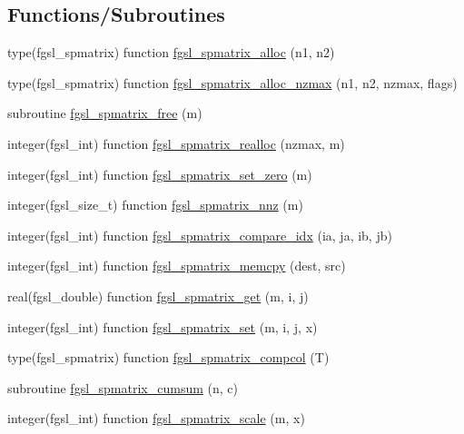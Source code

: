 \subsection*{Functions/\+Subroutines}
\begin{DoxyCompactItemize}
\item 
type(fgsl\+\_\+spmatrix) function \hyperlink{spmatrix_8finc_a55420bf9189f388cdc2fbf2eb3c516d9}{fgsl\+\_\+spmatrix\+\_\+alloc} (n1, n2)
\item 
type(fgsl\+\_\+spmatrix) function \hyperlink{spmatrix_8finc_ab79d40aba35d16643dc6bfd7534a8887}{fgsl\+\_\+spmatrix\+\_\+alloc\+\_\+nzmax} (n1, n2, nzmax, flags)
\item 
subroutine \hyperlink{spmatrix_8finc_ac80747abc62a878f2681d899fe914af6}{fgsl\+\_\+spmatrix\+\_\+free} (m)
\item 
integer(fgsl\+\_\+int) function \hyperlink{spmatrix_8finc_a9a826353e1e93de1f5772675f61618ac}{fgsl\+\_\+spmatrix\+\_\+realloc} (nzmax, m)
\item 
integer(fgsl\+\_\+int) function \hyperlink{spmatrix_8finc_ab70890d4bf15e5a4e5a02c4942fde10a}{fgsl\+\_\+spmatrix\+\_\+set\+\_\+zero} (m)
\item 
integer(fgsl\+\_\+size\+\_\+t) function \hyperlink{spmatrix_8finc_a16a15f6ddd266c3a483293581f42df2c}{fgsl\+\_\+spmatrix\+\_\+nnz} (m)
\item 
integer(fgsl\+\_\+int) function \hyperlink{spmatrix_8finc_aa280c02fef9cf0c191918a8f6c512ae3}{fgsl\+\_\+spmatrix\+\_\+compare\+\_\+idx} (ia, ja, ib, jb)
\item 
integer(fgsl\+\_\+int) function \hyperlink{spmatrix_8finc_ac3071cab0cb3dff1c684f7efd896d883}{fgsl\+\_\+spmatrix\+\_\+memcpy} (dest, src)
\item 
real(fgsl\+\_\+double) function \hyperlink{spmatrix_8finc_acb8f6abfa898b6c32dd1fac0b20a07ee}{fgsl\+\_\+spmatrix\+\_\+get} (m, i, j)
\item 
integer(fgsl\+\_\+int) function \hyperlink{spmatrix_8finc_a2b4b03f250c6d49acc4026e0f6bfe158}{fgsl\+\_\+spmatrix\+\_\+set} (m, i, j, x)
\item 
type(fgsl\+\_\+spmatrix) function \hyperlink{spmatrix_8finc_ae6af53877532743d9acaa09abc5c7ae3}{fgsl\+\_\+spmatrix\+\_\+compcol} (T)
\item 
subroutine \hyperlink{spmatrix_8finc_a52d9e6993ec3bf4428010ec1dfe7f835}{fgsl\+\_\+spmatrix\+\_\+cumsum} (n, c)
\item 
integer(fgsl\+\_\+int) function \hyperlink{spmatrix_8finc_ac52ce5bc52bd99ca4663b92509665a9e}{fgsl\+\_\+spmatrix\+\_\+scale} (m, x)

\end{DoxyCompactItemize}
